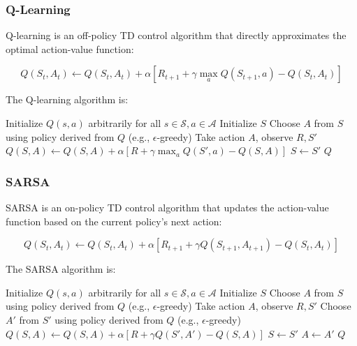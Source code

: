 \documentclass{article}
\begin{document}
\subsubsection{Q-Learning}

Q-learning is an off-policy TD control algorithm that directly approximates the optimal action-value function:

\begin{equation}
Q(S_t, A_t) \leftarrow Q(S_t, A_t) + \alpha [R_{t+1} + \gamma \max_a Q(S_{t+1}, a) - Q(S_t, A_t)]
\end{equation}

The Q-learning algorithm is:

\begin{algorithm}
\begin{algorithmic}[1]
\STATE Initialize $Q(s,a)$ arbitrarily for all $s \in \mathcal{S}, a \in \mathcal{A}$
\REPEAT
    \STATE Initialize $S$
    \REPEAT
        \STATE Choose $A$ from $S$ using policy derived from $Q$ (e.g., $\epsilon$-greedy)
        \STATE Take action $A$, observe $R, S'$
        \STATE $Q(S,A) \leftarrow Q(S,A) + \alpha [R + \gamma \max_a Q(S',a) - Q(S,A)]$
        \STATE $S \leftarrow S'$
\RETURN $Q$
\end{algorithmic}
\end{algorithm}

\subsubsection{SARSA}

SARSA is an on-policy TD control algorithm that updates the action-value function based on the current policy's next action:

\begin{equation}
Q(S_t, A_t) \leftarrow Q(S_t, A_t) + \alpha [R_{t+1} + \gamma Q(S_{t+1}, A_{t+1}) - Q(S_t, A_t)]
\end{equation}

The SARSA algorithm is:

\begin{algorithm}
\begin{algorithmic}[1]
\STATE Initialize $Q(s,a)$ arbitrarily for all $s \in \mathcal{S}, a \in \mathcal{A}$
\REPEAT
    \STATE Initialize $S$
    \STATE Choose $A$ from $S$ using policy derived from $Q$ (e.g., $\epsilon$-greedy)
    \REPEAT
        \STATE Take action $A$, observe $R, S'$
        \STATE Choose $A'$ from $S'$ using policy derived from $Q$ (e.g., $\epsilon$-greedy)
        \STATE $Q(S,A) \leftarrow Q(S,A) + \alpha [R + \gamma Q(S',A') - Q(S,A)]$
        \STATE $S \leftarrow S'$
        \STATE $A \leftarrow A'$
\RETURN $Q$
\end{algorithmic}
\end{algorithm}
\end{document}
